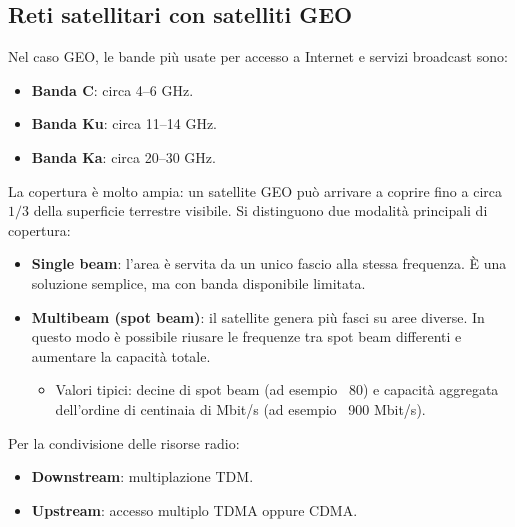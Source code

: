 \subsection{Reti satellitari con satelliti GEO}
Nel caso GEO, le bande più usate per accesso a Internet e servizi broadcast sono:
\begin{itemize}
	\item \textbf{Banda C}: circa 4--6 GHz.
	\item \textbf{Banda Ku}: circa 11--14 GHz.
	\item \textbf{Banda Ka}: circa 20--30 GHz.
\end{itemize}
\noindent
La copertura è molto ampia: un satellite GEO può arrivare a coprire fino a circa \(1/3\) della superficie terrestre visibile.
\noindent
Si distinguono due modalità principali di copertura:
\begin{itemize}
	\item \textbf{Single beam}: l'area è servita da un unico fascio alla stessa frequenza. È una soluzione semplice, ma con banda disponibile limitata.
	\item \textbf{Multibeam (spot beam)}: il satellite genera più fasci su aree diverse. In questo modo è possibile riusare le frequenze tra spot beam differenti e aumentare la capacità totale.
	\begin{itemize}
		\item Valori tipici: decine di spot beam (ad esempio ~80) e capacità aggregata dell'ordine di centinaia di Mbit/s (ad esempio ~900 Mbit/s).
	\end{itemize}
\end{itemize}

Per la condivisione delle risorse radio:
\begin{itemize}
	\item \textbf{Downstream}: multiplazione TDM.
	\item \textbf{Upstream}: accesso multiplo TDMA oppure CDMA.
\end{itemize}

